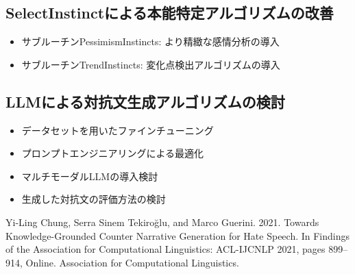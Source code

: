 \documentclass[dvipdfmx]{jsarticle}
\begin{document}
\subsection{SelectInstinctによる本能特定アルゴリズムの改善}

\begin{itemize}
  \item サブルーチンPessimismInstincts: より精緻な感情分析の導入
  \item サブルーチンTrendInstincts: 変化点検出アルゴリズムの導入
\end{itemize}

\vspace{0.5em}

\subsection{LLMによる対抗文生成アルゴリズムの検討}

\begin{itemize}
  \item データセットを用いたファインチューニング
  \item プロンプトエンジニアリングによる最適化
  \item マルチモーダルLLMの導入検討
  \item 生成した対抗文の評価方法の検討
\end{itemize}

\vspace{1em}

\begin{thebibliography}{99}
  Yi-Ling Chung, Serra Sinem Tekiroğlu, and Marco Guerini. 2021. Towards Knowledge-Grounded Counter Narrative Generation for Hate Speech. In Findings of the Association for Computational Linguistics: ACL-IJCNLP 2021, pages 899–914, Online. Association for Computational Linguistics.

\end{thebibliography}
\end{document}
